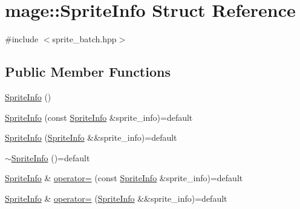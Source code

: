 \hypertarget{structmage_1_1_sprite_info}{}\section{mage\+:\+:Sprite\+Info Struct Reference}
\label{structmage_1_1_sprite_info}


{\ttfamily \#include $<$sprite\+\_\+batch.\+hpp$>$}

\subsection*{Public Member Functions}
\begin{DoxyCompactItemize}
\item 
\hyperlink{structmage_1_1_sprite_info_a95544c5b70d30b273a482139c4299be0}{Sprite\+Info} ()
\item 
\hyperlink{structmage_1_1_sprite_info_a42bf55280335f8bc91b614145f766f51}{Sprite\+Info} (const \hyperlink{structmage_1_1_sprite_info}{Sprite\+Info} \&sprite\+\_\+info)=default
\item 
\hyperlink{structmage_1_1_sprite_info_ab1aaf7a0a3f3723b0836dd6e9ec6bc3e}{Sprite\+Info} (\hyperlink{structmage_1_1_sprite_info}{Sprite\+Info} \&\&sprite\+\_\+info)=default
\item 
\hyperlink{structmage_1_1_sprite_info_a17d9161b88c7f920419ae9aaf8c11299}{$\sim$\+Sprite\+Info} ()=default
\item 
\hyperlink{structmage_1_1_sprite_info}{Sprite\+Info} \& \hyperlink{structmage_1_1_sprite_info_a843c253e10ec7fd90412b5adb6ccc17f}{operator=} (const \hyperlink{structmage_1_1_sprite_info}{Sprite\+Info} \&sprite\+\_\+info)=default
\item 
\hyperlink{structmage_1_1_sprite_info}{Sprite\+Info} \& \hyperlink{structmage_1_1_sprite_info_ae504d8d63f6cabd0f9c9c28833bb9366}{operator=} (\hyperlink{structmage_1_1_sprite_info}{Sprite\+Info} \&\&sprite\+\_\+info)=default
\end{DoxyCompactItemize}
